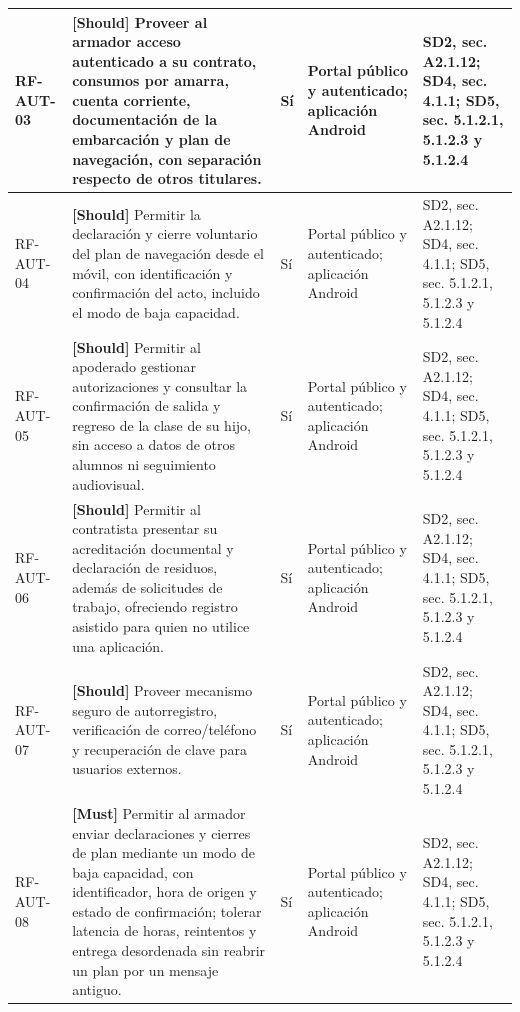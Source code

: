 \begin{paginaHorizontalSynaptix}
\begin{longtable}{|L{0.09\AnchoMatrizTDoce}|L{0.385\AnchoMatrizTDoce}|L{0.065\AnchoMatrizTDoce}|L{0.18\AnchoMatrizTDoce}|L{0.28\AnchoMatrizTDoce}|}
RF-\allowbreak{}AUT-\allowbreak{}03 &
\textbf{[Should]} Proveer al armador acceso autenticado a su contrato, consumos por amarra, cuenta corriente, documentación de la embarcación y plan de navegación, con separación respecto de otros titulares. &
Sí &
Portal público y autenticado; aplicación Android &
SD2, sec. A2.1.12; SD4, sec. 4.1.1; SD5, sec. 5.1.2.1, 5.1.2.3 y 5.1.2.4 \\ \hline

RF-\allowbreak{}AUT-\allowbreak{}04 &
\textbf{[Should]} Permitir la declaración y cierre voluntario del plan de navegación desde el móvil, con identificación y confirmación del acto, incluido el modo de baja capacidad. &
Sí &
Portal público y autenticado; aplicación Android &
SD2, sec. A2.1.12; SD4, sec. 4.1.1; SD5, sec. 5.1.2.1, 5.1.2.3 y 5.1.2.4 \\ \hline

RF-\allowbreak{}AUT-\allowbreak{}05 &
\textbf{[Should]} Permitir al apoderado gestionar autorizaciones y consultar la confirmación de salida y regreso de la clase de su hijo, sin acceso a datos de otros alumnos ni seguimiento audiovisual. &
Sí &
Portal público y autenticado; aplicación Android &
SD2, sec. A2.1.12; SD4, sec. 4.1.1; SD5, sec. 5.1.2.1, 5.1.2.3 y 5.1.2.4 \\ \hline

RF-\allowbreak{}AUT-\allowbreak{}06 &
\textbf{[Should]} Permitir al contratista presentar su acreditación documental y declaración de residuos, además de solicitudes de trabajo, ofreciendo registro asistido para quien no utilice una aplicación. &
Sí &
Portal público y autenticado; aplicación Android &
SD2, sec. A2.1.12; SD4, sec. 4.1.1; SD5, sec. 5.1.2.1, 5.1.2.3 y 5.1.2.4 \\ \hline

RF-\allowbreak{}AUT-\allowbreak{}07 &
\textbf{[Should]} Proveer mecanismo seguro de autorregistro, verificación de correo/teléfono y recuperación de clave para usuarios externos. &
Sí &
Portal público y autenticado; aplicación Android &
SD2, sec. A2.1.12; SD4, sec. 4.1.1; SD5, sec. 5.1.2.1, 5.1.2.3 y 5.1.2.4 \\ \hline

RF-\allowbreak{}AUT-\allowbreak{}08 &
\textbf{[Must]} Permitir al armador enviar declaraciones y cierres de plan mediante un modo de baja capacidad, con identificador, hora de origen y estado de confirmación; tolerar latencia de horas, reintentos y entrega desordenada sin reabrir un plan por un mensaje antiguo. &
Sí &
Portal público y autenticado; aplicación Android &
SD2, sec. A2.1.12; SD4, sec. 4.1.1; SD5, sec. 5.1.2.1, 5.1.2.3 y 5.1.2.4 \\ \hline


\end{longtable}
\end{paginaHorizontalSynaptix}
